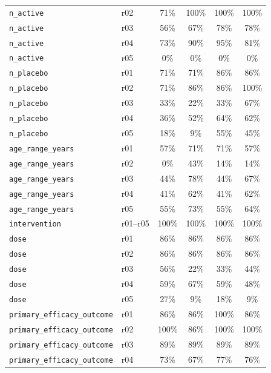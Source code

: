 \documentclass[a4paper,fleqn]{cas-sc}
\begin{document}
\begin{table}[ht]
\begin{tabular*}{\tblwidth}{@{}p{3.6cm}p{0.6cm}cccc@{}}
\texttt{n\_active}          & r02 & 71\%  & 100\% & 100\% & 100\% \\
\texttt{n\_active}          & r03 & 56\%  & 67\%  & 78\%  & 78\%  \\
\texttt{n\_active}          & r04 & 73\%  & 90\%  & 95\%  & 81\%  \\
\texttt{n\_active}          & r05 & 0\%   & 0\%   & 0\%   & 0\%   \\
\midrule
\texttt{n\_placebo}         & r01 & 71\%  & 71\%  & 86\%  & 86\%  \\
\texttt{n\_placebo}         & r02 & 71\%  & 86\%  & 86\%  & 100\% \\
\texttt{n\_placebo}         & r03 & 33\%  & 22\%  & 33\%  & 67\%  \\
\texttt{n\_placebo}         & r04 & 36\%  & 52\%  & 64\%  & 62\%  \\
\texttt{n\_placebo}         & r05 & 18\%  & 9\%   & 55\%  & 45\%  \\
\midrule
\texttt{age\_range\_years}  & r01 & 57\%  & 71\%  & 71\%  & 57\%  \\
\texttt{age\_range\_years}  & r02 & 0\%   & 43\%  & 14\%  & 14\%  \\
\texttt{age\_range\_years}  & r03 & 44\%  & 78\%  & 44\%  & 67\%  \\
\texttt{age\_range\_years}  & r04 & 41\%  & 62\%  & 41\%  & 62\%  \\
\texttt{age\_range\_years}  & r05 & 55\%  & 73\%  & 55\%  & 64\%  \\
\midrule
\texttt{intervention}       & r01--r05 & 100\% & 100\% & 100\% & 100\% \\
\midrule
\texttt{dose}               & r01 & 86\%  & 86\%  & 86\%  & 86\%  \\
\texttt{dose}               & r02 & 86\%  & 86\%  & 86\%  & 86\%  \\
\texttt{dose}               & r03 & 56\%  & 22\%  & 33\%  & 44\%  \\
\texttt{dose}               & r04 & 59\%  & 67\%  & 59\%  & 48\%  \\
\texttt{dose}               & r05 & 27\%  & 9\%   & 18\%  & 9\%   \\
\midrule
\texttt{primary\_efficacy\_outcome} & r01 & 86\% & 86\% & 100\% & 86\% \\
\texttt{primary\_efficacy\_outcome} & r02 & 100\% & 86\% & 100\% & 100\% \\
\texttt{primary\_efficacy\_outcome} & r03 & 89\% & 89\% & 89\% & 89\% \\
\texttt{primary\_efficacy\_outcome} & r04 & 73\% & 67\% & 77\% & 76\% \\

\end{tabular*}
\end{table}
\end{document}
